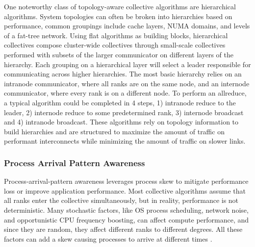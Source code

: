One noteworthy class of topology-aware collective algorithms are hierarchical algorithms.
System topologies can often be broken into hierarchies based on performance, common groupings include cache layers, NUMA domains, and levels of a fat-tree network.
Using flat algorithms as building blocks, hierarchical collectives compose cluster-wide collectives through small-scale collectives performed with subsets of the larger communicator on different layers of the hierarchy.
Each grouping on a hierarchical layer will select a leader responsible for communicating across higher hierarchies.
The most basic hierarchy relies on an intranode communicator, where all ranks are on the same node, and an internode communicator, where every rank is on a different node.
To perform an allreduce, a typical algorithm could be completed in 4 steps, 1) intranode reduce to the leader, 2) internode reduce to some predetermined rank, 3) internode broadcast and 4) intranode broadcast.
These algorithms rely on topology information to build hierarchies and are structured to maximize the amount of traffic on performant interconnects while minimizing the amount of traffic on slower links.

\subsubsection{Process Arrival Pattern Awareness}
Process-arrival-pattern awareness leverages process skew to mitigate performance loss or improve application performance. 
Most collective algorithms assume that all ranks enter the collective simultaneously, but in reality, performance is not deterministic.
Many stochastic factors, like OS process scheduling, network noise, and opportunistic CPU frequency boosting, can affect compute performance, and since they are random, they affect different ranks to different degrees.
All these factors can add a skew causing processes to arrive at different times \cite{Faraj2008StudyProcArrivalMPIColl}.



